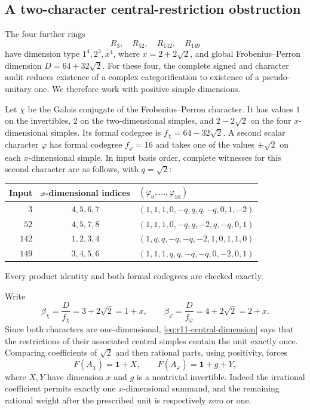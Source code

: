 \documentclass[11pt,a4paper]{article}
\begin{document}
\subsection{A two-character central-restriction obstruction}
\label{subsec:r11-two-character}

The four further rings
\[
 R_3,\quad R_{52},\quad R_{142},\quad R_{149}
\]
have dimension type $1^4,2^3,x^4$, where
$x=2+2\sqrt2$, and global Frobenius--Perron dimension
$D=64+32\sqrt2$. For these four, the complete signed and character audit
reduces existence of a complex categorification to existence of a
pseudo-unitary one. We therefore work with positive simple dimensions.

Let $\chi$ be the Galois conjugate of the Frobenius--Perron character.
It has values $1$ on the invertibles, $2$ on the two-dimensional simples,
and $2-2\sqrt2$ on the four $x$-dimensional simples. Its formal codegree is
$f_\chi=64-32\sqrt2$. A second scalar character $\varphi$ has formal
codegree $f_\varphi=16$ and takes one of the values $\pm\sqrt2$ on each
$x$-dimensional simple. In input basis order, complete witnesses for this
second character are as follows, with $q=\sqrt2$:
\begin{center}
\small
\renewcommand{\arraystretch}{1.2}
\begin{tabular}{@{}rcl@{}}
\toprule
Input & $x$-dimensional indices & $(\varphi_0,\ldots,\varphi_{10})$\\
\midrule
$3$   & $4,5,6,7$ & $(1,1,1,0,-q,q,q,-q,0,1,-2)$\\
$52$  & $4,5,7,8$ & $(1,1,1,0,-q,q,-2,q,-q,0,1)$\\
$142$ & $1,2,3,4$ & $(1,q,q,-q,-q,-2,1,0,1,1,0)$\\
$149$ & $3,4,5,6$ & $(1,1,1,q,q,-q,-q,0,-2,0,1)$\\
\bottomrule
\end{tabular}
\end{center}
Every product identity and both formal codegrees are checked exactly.

Write
\[
 \beta_\chi=\frac{D}{f_\chi}=3+2\sqrt2=1+x,
 \qquad
 \beta_\varphi=\frac{D}{f_\varphi}=4+2\sqrt2=2+x.
\]
Since both characters are one-dimensional,
\eqref{eq:r11-central-dimension} says that the restrictions of their
associated central simples contain the unit exactly once. Comparing
coefficients of $\sqrt2$ and then rational parts, using positivity, forces
\begin{equation}\label{eq:r11-forced-restrictions}
 F(A_\chi)=\mathbf1+X,
 \qquad
 F(A_\varphi)=\mathbf1+g+Y,
\end{equation}
where $X,Y$ have dimension $x$ and $g$ is a nontrivial invertible.
Indeed the irrational coefficient permits exactly one $x$-dimensional
summand, and the remaining rational weight after the prescribed unit is
respectively zero or one.
\end{document}
